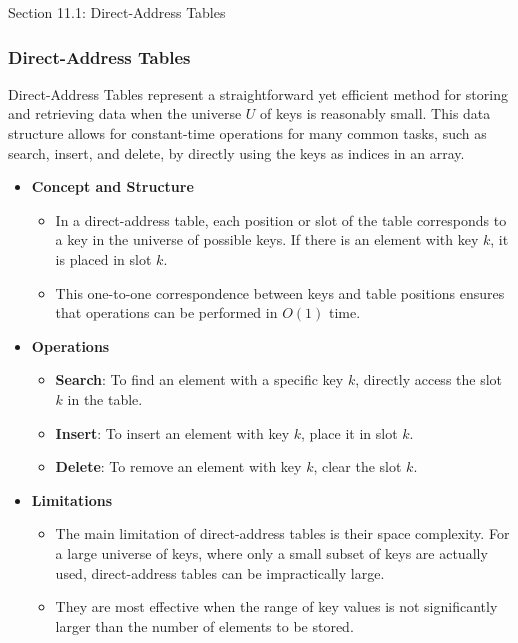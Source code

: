 \begin{notes}{Section 11.1: Direct-Address Tables}
    \subsubsection*{Direct-Address Tables}

    Direct-Address Tables represent a straightforward yet efficient method for storing and retrieving data when the universe $U$ of keys is reasonably small. This data structure allows for constant-time 
    operations for many common tasks, such as search, insert, and delete, by directly using the keys as indices in an array.
    
    \begin{itemize}
        \item \textbf{Concept and Structure}
        \begin{itemize}
            \item In a direct-address table, each position or slot of the table corresponds to a key in the universe of possible keys. If there is an element with key $k$, it is placed in slot $k$.
            \item This one-to-one correspondence between keys and table positions ensures that operations can be performed in $O(1)$ time.
        \end{itemize}
        
        \item \textbf{Operations}
        \begin{itemize}
            \item \textbf{Search}: To find an element with a specific key $k$, directly access the slot $k$ in the table.
            \item \textbf{Insert}: To insert an element with key $k$, place it in slot $k$.
            \item \textbf{Delete}: To remove an element with key $k$, clear the slot $k$.
        \end{itemize}
        
        \item \textbf{Limitations}
        \begin{itemize}
            \item The main limitation of direct-address tables is their space complexity. For a large universe of keys, where only a small subset of keys are actually used, direct-address tables can 
            be impractically large.
            \item They are most effective when the range of key values is not significantly larger than the number of elements to be stored.
        \end{itemize}
    \end{itemize}
    

\end{notes}

